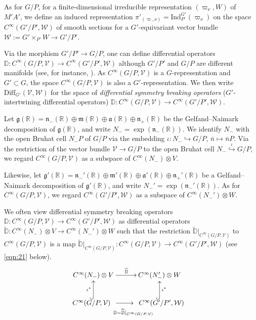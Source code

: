 \documentclass[reqno,11pt]{amsart}
\theoremstyle{remark}
\theoremstyle{definition}
\numberwithin{equation}{section}
\newcommand{\fn}{{\mathfrak n}}
\newcommand{\R}{\mathbb{R}}
\newcommand{\Cal}{\mathcal}
\newcommand{\Ind}{\mathrm{Ind}}
\newcommand{\Diff}{\mathrm{Diff}}
\newcommand{\w}{\widetilde}
\newcommand{\bD}{\mathbb{D}}
\begin{document}
As for $G/P$, for a finite-dimensional irreducible
representation $(\varpi_\nu, W)$ of $M'A'$, we define
an induced representation $\pi'_{(\varpi, \nu)}=\Ind_{P'}^{G'}(\varpi_\nu)$ on the 
space $C^\infty(G'/P', \Cal{W})$ of smooth sections for a 
$G'$-equivariant vector bundle $\Cal{W}:=G'\times_{P'}W \to G'/P'$.

Via the morphism $G'/P' \to G/P$, one can define 
differential operators $\bD\colon C^\infty(G/P, \Cal{V}) \to C^\infty(G'/P', \Cal{W})$
although $G'/P'$ and $G/P$ are different manifolds 
(see, for instance, \cite[Def.\ 2.1]{KP1}).
As $C^\infty(G/P, \Cal{V})$ is a $G$-representation and $G' \subset G$,
the space $C^\infty(G/P, \Cal{V})$ is also a $G'$-representation.
We then write $\Diff_{G'}(\Cal{V},\Cal{W})$ for the space of 
\emph{differential symmetry breaking operators} 
($G'$-intertwining differential operators)
$\bD \colon C^\infty(G/P, \Cal{V}) \to C^\infty(G'/P', \Cal{W})$.

Let 
$\mathfrak{g}(\R)=\mathfrak{n}_-(\R) \oplus \mathfrak{m}(\R) 
\oplus \mathfrak{a}(\R) \oplus \mathfrak{n}_+(\R)$ 
be the 
Gelfand--Naimark decomposition of $\mathfrak{g}(\R)$,
and write $N_- = \exp(\fn_-(\R))$. We identify $N_-$ with the 
open Bruhat cell $N_-P$ of $G/P$ via the embedding 
$\iota\colon N_- \hookrightarrow G/P$, $\bar{n} \mapsto \bar{n}P$.
Via the restriction of the vector bundle $\Cal{V} \to G/P$ to the open Bruhat cell
$N_-\stackrel{\iota}{\hookrightarrow} G/P$,
we regard $C^\infty(G/P,\mathcal{V})$ as a subspace of 
$C^\infty(N_-) \otimes V$.

Likewise,
let 
$\mathfrak{g}'(\R)=\mathfrak{n}_-'(\R) \oplus \mathfrak{m}'(\R) 
\oplus \mathfrak{a}'(\R) \oplus \mathfrak{n}_+'(\R)$ 
be a 
Gelfand--Naimark decomposition of $\mathfrak{g}'(\R)$,
and write $N_-' = \exp(\fn_-'(\R))$.
As for $C^\infty(G/P,\Cal{V})$, we regard $C^\infty(G'/P',\Cal{W})$
as a subspace of $C^\infty(N_-')\otimes W$.

We often view differential symmetry breaking operators
$\bD \colon
C^\infty(G/P,\mathcal{V})
\to C^\infty(G'/P',\mathcal{W})$
as differential operators 
$\w{\bD} \colon C^\infty(N_-) \otimes V
\to C^\infty(N_-') \otimes W$ 
such that
the restriction $\w{\bD}\vert_{C^\infty(G/P,\mathcal{V})}$
to $C^\infty(G/P,\mathcal{V})$ is a map
$\w{\bD}\vert_{C^\infty(G/P,\mathcal{V})}\colon
C^\infty(G/P,\mathcal{V})
\to C^\infty(G'/P',\mathcal{W})$ (see \eqref{eqn:21} below).
\begin{equation}\label{eqn:21}
\begin{aligned}
\xymatrix{
C^\infty(N_-) \otimes V 
\ar[r]^{\w{\bD} } 
& C^\infty(N_-') \otimes W\\ 
C^\infty(G/P,\mathcal{V}) 
\;\; \ar[r]_{\stackrel{\phantom{a}}{\hspace{20pt}\bD=\w{\bD} \vert_{\small{C^\infty(G/P,\mathcal{V})}}} }
 \ar@{^{(}->}[u]^{\iota^*}
& \;\; C^\infty(G'/P',\mathcal{W}) \ar@{^{(}->}[u]_{\iota^*}
}
\end{aligned}
\end{equation}
\end{document}
